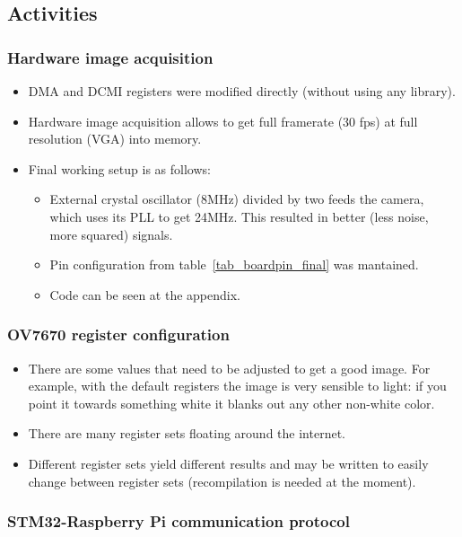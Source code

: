 \subsection{Activities}


\subsubsection{Hardware image acquisition}
\begin{itemize}
	\item DMA and DCMI registers were modified directly (without using any library).
	\item Hardware image acquisition allows to get full framerate (30 fps) at full resolution (VGA) into memory.
	\item Final working setup is as follows:
	\begin{itemize}
		\item External crystal oscillator (8MHz) divided by two feeds the camera, which uses its PLL to get 24MHz. This resulted in better (less noise, more squared) signals.
		\item Pin configuration from table~\ref{tab_boardpin_final} was mantained.
		\item Code can be seen at the appendix.
	\end{itemize}
\end{itemize}

\subsubsection{OV7670 register configuration}
\begin{itemize}
	\item There are some values that need to be adjusted to get a good image. For example, with the default registers the image is very sensible to light: if you point it towards something white it blanks out any other non-white color.
	\item There are many register sets floating around the internet.
	\item Different register sets yield different results and may be written to easily change between register sets (recompilation is needed at the moment).
\end{itemize}

\subsubsection{STM32-Raspberry Pi communication protocol}

